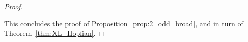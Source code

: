 \documentclass[10pt,a4paper]{amsart}
\theoremstyle{plain}
\begin{document}
\begin{proof}
\begin{itemize}
    \end{itemize}
This concludes the proof of Proposition~\ref{prop:2_odd_broad}, and in turn of Theorem~\ref{thm:XL_Hopfian}. \end{proof}
\end{document}
